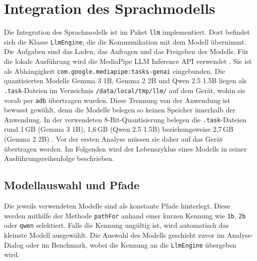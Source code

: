 \section{Integration des Sprachmodells}
\label{sec:impl-llm}
Die Integration des Sprachmodells ist im Paket \texttt{llm} implementiert. Dort befindet sich die Klasse \texttt{LlmEngine}, die die Kommunikation mit dem Modell übernimmt. Die Aufgaben sind das Laden, das Anfragen und das Freigeben des Modells. Für die lokale Ausführung wird die MediaPipe LLM Inference API verwendet \autocite{mediapipe_llm}. Sie ist als Abhängigkeit \texttt{com.google.\allowbreak mediapipe:\allowbreak tasks-genai} eingebunden. Die quantisierten Modelle Gemma 3 1B, Gemma 2 2B und Qwen 2.5 1.5B liegen als \texttt{.task}-Dateien im Verzeichnis \texttt{/data/\allowbreak local/\allowbreak tmp/\allowbreak llm/} auf dem Gerät, wohin sie vorab per \texttt{adb} übertragen wurden. Diese Trennung von der Anwendung ist bewusst gewählt, denn die Modelle belegen so keinen Speicher innerhalb der Anwendung. In der verwendeten 8-Bit-Quantisierung belegen die \texttt{.task}-Dateien rund 1\,GB (Gemma 3 1B), 1,6\,GB (Qwen 2.5 1.5B) beziehungsweise 2,7\,GB (Gemma 2 2B) \autocite{gemma3_litert, qwen_litert, gemma2_litert}. Vor der ersten Analyse müssen sie daher auf das Gerät übertragen werden. Im Folgenden wird der Lebenszyklus eines Modells in seiner Ausführungsreihenfolge beschrieben.
\subsection{Modellauswahl und Pfade} Die jeweils verwendeten Modelle sind als konstante Pfade hinterlegt. Diese werden mithilfe der Methode \texttt{pathFor} anhand einer kurzen Kennung wie \texttt{1b}, \texttt{2b} oder \texttt{qwen} selektiert. Falls die Kennung ungültig ist, wird automatisch das kleinste Modell ausgewählt. Die Auswahl des Modells geschieht zuvor im Analyse-Dialog oder im Benchmark, wobei die Kennung an die \texttt{LlmEngine} übergeben wird.

